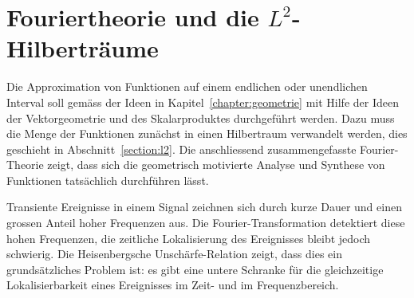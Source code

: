 %
%
%
\chapter{Fouriertheorie und die $L^2$-Hilberträume
\label{chapter:fourier}}
Die Approximation von Funktionen auf einem endlichen oder unendlichen
Interval soll gemäss der Ideen in Kapitel~\ref{chapter:geometrie}
mit Hilfe der Ideen der Vektorgeometrie und des Skalarproduktes
durchgeführt werden.
Dazu muss die Menge der Funktionen zunächst in einen Hilbertraum
verwandelt werden, dies geschieht in Abschnitt~\ref{section:l2}.
Die anschliessend zusammengefasste Fourier-Theorie zeigt, dass sich
die geometrisch motivierte Analyse und Synthese von Funktionen
tatsächlich durchführen lässt.

Transiente Ereignisse in einem Signal zeichnen sich durch kurze Dauer
und einen grossen Anteil hoher Frequenzen aus.
Die Fourier-Transformation detektiert diese hohen Frequenzen, die
zeitliche Lokalisierung des Ereignisses bleibt jedoch schwierig.
Die Heisenbergsche Unschärfe-Relation zeigt, dass dies ein grundsätzliches
Problem ist: es gibt eine untere Schranke für die gleichzeitige
Lokalisierbarkeit eines Ereignisses im Zeit- und im Frequenzbereich.






